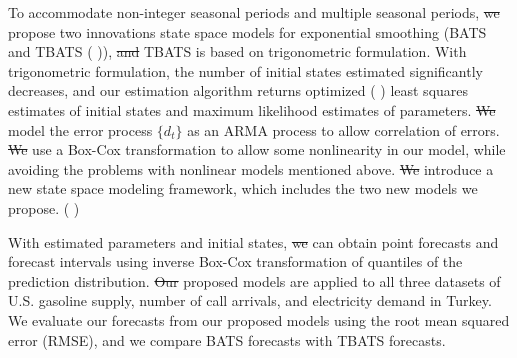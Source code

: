 \documentclass{uwstat572}
\newcommand{\vmdel}[1]{\sout{#1}}
\newcommand{\vmadd}[1]{\textbf{\color{red}{#1}}}
\newcommand{\vmcomment}[1]{({\color{blue}{VM's comment:}} \textbf{\color{blue}{#1}})}
\begin{document}
To accommodate non-integer seasonal periods and multiple seasonal periods, \vmadd{\citet{de2011forecasting}} \vmdel{we} propose two innovations state space models for exponential smoothing (BATS and TBATS \vmcomment{--- define these abbreviations}), \vmadd{where} \vmdel{and} TBATS is \vmadd{an extension of BATS} based on trigonometric formulation. With trigonometric formulation, the number of initial states estimated significantly decreases, and our estimation algorithm returns optimized \vmcomment{the word optimized is meaningless if you don't state the optimization criterion; do you mean estimated here?} least squares estimates of initial states and maximum likelihood estimates of parameters. \vmadd{\citet{de2011forecasting}} \vmdel{We} model the error process $\{d_t\}$ as an ARMA process to allow correlation of errors. \vmadd{\citet{de2011forecasting}} \vmdel{We} use a Box-Cox transformation to allow some nonlinearity in our model, while avoiding the problems with nonlinear models mentioned above. \vmadd{\citet{de2011forecasting}} \vmdel{We} introduce a new state space modeling framework, which includes the two new models we propose. \vmcomment{Your writing became too monotonic in the last three sentences.}

With estimated parameters and initial states, \vmadd{\citet{de2011forecasting}} \vmdel{we} can obtain point forecasts and forecast intervals using inverse Box-Cox transformation of quantiles of the prediction distribution. 
\vmdel{Our} \vmadd{We reproduced the} proposed models are applied \vmadd{them} to all three datasets of U.S. gasoline supply, number of call arrivals, and electricity demand in Turkey.  We evaluate our forecasts from our proposed models using the root mean squared error (RMSE), and we compare BATS forecasts with TBATS forecasts.

\nocite{*}


\end{document}
